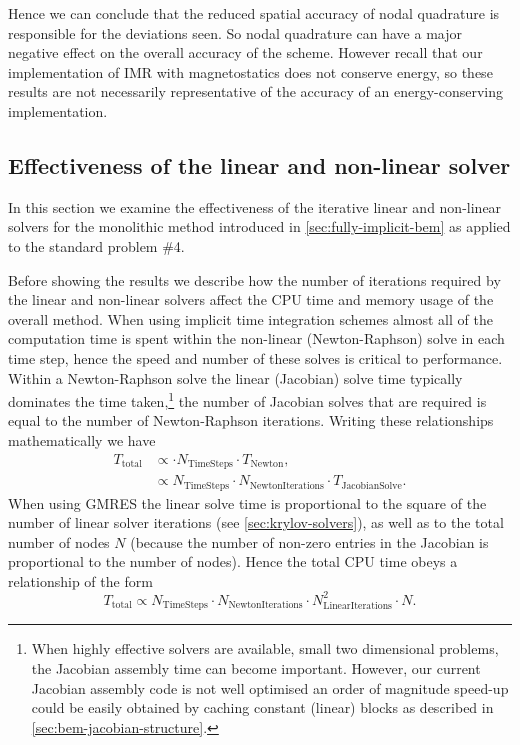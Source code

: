 Hence we can conclude that the reduced spatial accuracy of nodal quadrature is responsible for the deviations seen.
So nodal quadrature can have a major negative effect on the overall accuracy of the scheme.
However recall that our implementation of IMR with magnetostatics does not conserve energy, so these results are not necessarily representative of the accuracy of an energy-conserving implementation.


\subsection{Effectiveness of the linear and non-linear solver}
\label{sec:effect-line-non}

In this section we examine the effectiveness of the iterative linear and non-linear solvers for the monolithic method introduced in \cref{sec:fully-implicit-bem} as applied to the \mumag standard problem \#4.

\label{mem-cpu-solver-correction}
Before showing the results we describe how the number of iterations required by the linear and non-linear solvers affect the CPU time and memory usage of the overall method.
When using implicit time integration schemes almost all of the computation time is spent within the non-linear (\ie Newton-Raphson) solve in each time step, hence the speed and number of these solves is critical to performance.
Within a Newton-Raphson solve the linear (Jacobian) solve time typically dominates the time taken,\footnote{When highly effective solvers are available, \ie small two dimensional problems, the Jacobian assembly time can become important.
However, our current Jacobian assembly code is not well optimised \eg an order of magnitude speed-up could be easily obtained by caching constant (linear) blocks as described in \cref{sec:bem-jacobian-structure}.}
the number of Jacobian solves that are required is equal to the number of Newton-Raphson iterations.
Writing these relationships mathematically we have
\begin{equation}
  \begin{aligned}
    T_\mathrm{total} &\propto \cdot N_\mathrm{TimeSteps} \cdot T_\mathrm{Newton}, \\
                     &\propto N_\mathrm{TimeSteps} \cdot N_\mathrm{NewtonIterations} \cdot T_\mathrm{JacobianSolve}.
  \end{aligned}
\end{equation}
When using GMRES the linear solve time is proportional to the square of the number of linear solver iterations (see \cref{sec:krylov-solvers}), as well as to the total number of nodes $N$ (because the number of non-zero entries in the Jacobian is proportional to the number of nodes).
Hence the total CPU time obeys a relationship of the form
\begin{equation}
  T_\mathrm{total} \propto N_\mathrm{TimeSteps} \cdot N_\mathrm{NewtonIterations} \cdot N_\mathrm{LinearIterations}^2 \cdot N.
\end{equation}

